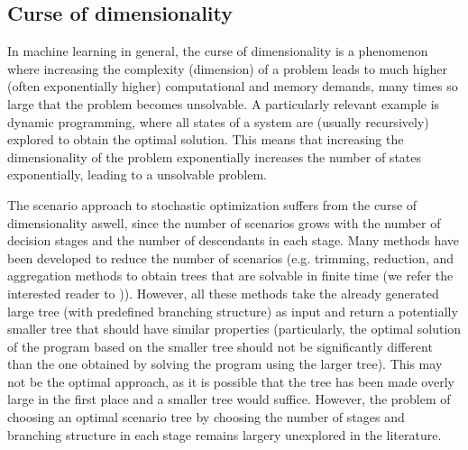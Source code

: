 \subsection{Curse of dimensionality}
In machine learning in general, the curse of dimensionality is a phenomenon where increasing the complexity (dimension) of a problem leads to much higher (often exponentially higher) computational and memory demands, many times so large that the problem becomes unsolvable. A particularly relevant example is dynamic programming, where all states of a system are (usually recursively) explored to obtain the optimal solution. This means that increasing the dimensionality of the problem exponentially increases the number of states exponentially, leading to a unsolvable problem. 

The scenario approach to stochastic optimization suffers from the curse of dimensionality aswell, since the number of scenarios grows with the number of decision stages and the number of descendants in each stage. Many methods have been developed to reduce the number of scenarios (e.g. trimming, reduction, and aggregation methods to obtain trees that are solvable in finite time (we refer the interested reader to \cite[p. 6]{dupacova_scenarios_for_multistage_stochastic_programs})). However, all these methods take the already generated large tree (with predefined branching structure) as input and return a potentially smaller tree that should have similar properties (particularly, the optimal solution of the program based on the smaller tree should not be significantly different than the one obtained by solving the program using the	 larger tree). This may not be the optimal approach, as it is possible that the tree has been made overly large in the first place and a smaller tree would suffice. However, the problem of choosing an optimal scenario tree by choosing the number of stages and branching structure in each stage remains largery unexplored in the literature. 